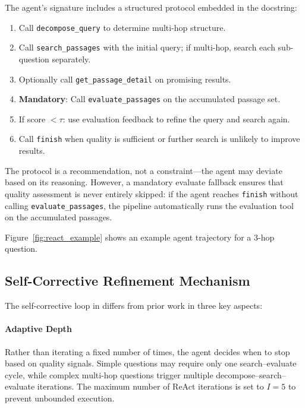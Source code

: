The agent's signature includes a structured protocol embedded in the docstring:

\begin{enumerate}
    \item Call \texttt{decompose\_query} to determine multi-hop structure.
    \item Call \texttt{search\_passages} with the initial query; if multi-hop, search each sub-question separately.
    \item Optionally call \texttt{get\_passage\_detail} on promising results.
    \item \textbf{Mandatory}: Call \texttt{evaluate\_passages} on the accumulated passage set.
    \item If score $< \tau$: use evaluation feedback to refine the query and search again.
    \item Call \texttt{finish} when quality is sufficient or further search is unlikely to improve results.
\end{enumerate}

The protocol is a recommendation, not a constraint---the agent may deviate based on its reasoning.
However, a mandatory evaluate fallback ensures that quality assessment is never entirely skipped: if the agent reaches \texttt{finish} without calling \texttt{evaluate\_passages}, the pipeline automatically runs the evaluation tool on the accumulated passages.

Figure~\ref{fig:react_example} shows an example agent trajectory for a 3-hop question.



\subsection{Self-Corrective Refinement Mechanism}
\label{subsec:refinement}

The self-corrective loop in \ours{} differs from prior work in three key aspects:

\paragraph{Adaptive Depth}
Rather than iterating a fixed number of times, the agent decides when to stop based on quality signals.
Simple questions may require only one search--evaluate cycle, while complex multi-hop questions trigger multiple decompose--search--evaluate iterations.
The maximum number of ReAct iterations is set to $I = 5$ to prevent unbounded execution.

